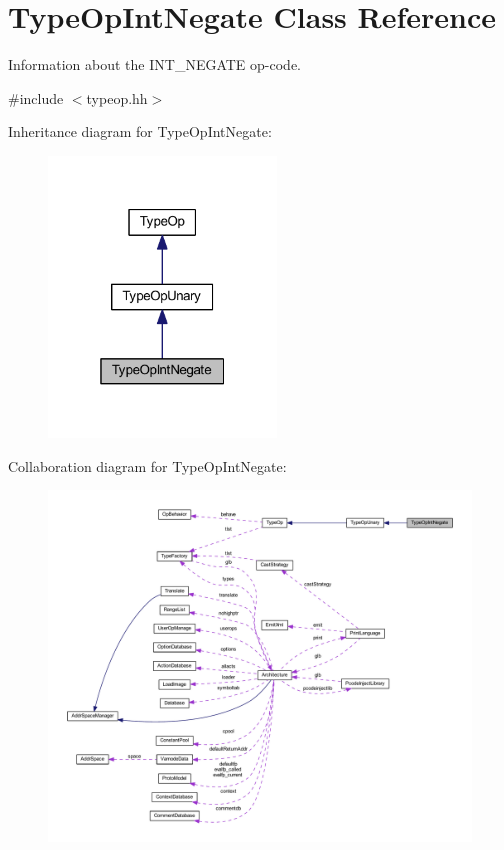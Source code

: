 \hypertarget{class_type_op_int_negate}{}\section{Type\+Op\+Int\+Negate Class Reference}
\label{class_type_op_int_negate}


Information about the I\+N\+T\+\_\+\+N\+E\+G\+A\+TE op-\/code.  




{\ttfamily \#include $<$typeop.\+hh$>$}



Inheritance diagram for Type\+Op\+Int\+Negate\+:
\nopagebreak
\begin{figure}[H]
\begin{center}
\leavevmode
\includegraphics[width=172pt]{class_type_op_int_negate__inherit__graph}
\end{center}
\end{figure}


Collaboration diagram for Type\+Op\+Int\+Negate\+:
\nopagebreak
\begin{figure}[H]
\begin{center}
\leavevmode
\includegraphics[width=350pt]{class_type_op_int_negate__coll__graph}
\end{center}
\end{figure}

